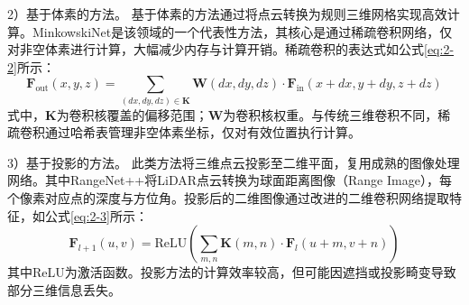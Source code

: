 2）基于体素的方法。
基于体素的方法通过将点云转换为规则三维网格实现高效计算。MinkowskiNet是该领域的一个代表性方法，其核心是通过稀疏卷积网络，仅对非空体素进行计算，大幅减少内存与计算开销。稀疏卷积的表达式如公式\eqref{eq:2-2}所示：
\begin{equation}
    \label{eq:2-2}
    \mathbf{F}_{\text{out}}(x,y,z) = \sum_{(dx,dy,dz) \in \mathbf{K}} \mathbf{W}(dx,dy,dz) \cdot \mathbf{F}_{\text{in}}(x+dx, y+dy, z+dz)
\end{equation}
式中，$\mathbf{K}$为卷积核覆盖的偏移范围；$\mathbf{W}$为卷积核权重。与传统三维卷积不同，稀疏卷积通过哈希表管理非空体素坐标，仅对有效位置执行计算。%


3）基于投影的方法。
此类方法将三维点云投影至二维平面，复用成熟的图像处理网络。其中RangeNet++将LiDAR点云转换为球面距离图像（Range Image），每个像素对应点的深度与方位角。投影后的二维图像通过改进的二维卷积网络提取特征，如公式\eqref{eq:2-3}所示：
\begin{equation}
    \label{eq:2-3}
    \mathbf{F}_{l+1}(u,v) = \text{ReLU}\left(\sum_{m,n} \mathbf{K}(m,n) \cdot \mathbf{F}_l(u+m, v+n)\right)
\end{equation}
其中ReLU为激活函数。投影方法的计算效率较高，但可能因遮挡或投影畸变导致部分三维信息丢失。%

